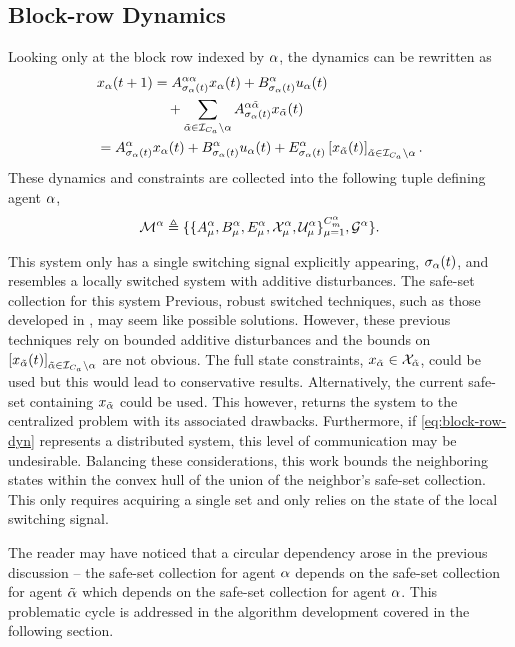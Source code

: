 \subsection{Block-row Dynamics}
Looking only at the block row indexed by $\alpha$, the dynamics can be rewritten as 
\begin{align}\label{eq:block-row-dyn}
x_\agentidx(t+1)&=A^{\agentidx\agentidx}_{\ss_\agentidx(t)}x_\agentidx(t)+B^\agentidx_{\ss_\agentidx(t)}u_\agentidx(t)\nonumber\\&\quad+\sum_{\tilde\agentidx\in\idxset{\numagents}\setminus \agentidx}A^{\agentidx\tilde\agentidx}_{\ss_\agentidx(t)}x_{\tilde\agentidx}(t)\\
=A^{\agentidx}_{\ss_\agentidx(t)}&x_\agentidx(t)+B^\agentidx_{\ss_\agentidx(t)}u_\agentidx(t)+E^\agentidx_{\ss_\agentidx(t)}\left[x_{\tilde\agentidx}(t)\right]_{\tilde\agentidx\in\idxset{\numagents}\setminus \agentidx}.
\end{align}
These dynamics and constraints are collected into the following tuple defining agent $\alpha$,
$$\agent{\agentidx}\triangleq\{\{A^{\agentidx}_{\modeidx},B^\agentidx_{\modeidx},E^\agentidx_{\modeidx},\xcon[\modeidx]^\agentidx,\ucon[\modeidx]^\agentidx\}_{\modeidx=1}^{\nummodes[\agentidx]},\graph^\agentidx\}.$$

This system only has a single switching signal explicitly appearing, ${\sigma}_{\alpha}(t)$, and resembles a locally switched system with additive disturbances. The safe-set collection for this system Previous, robust switched techniques, such as those developed in \cite{Lavaei2021}, may seem like possible solutions. However, these previous techniques rely on bounded additive disturbances and the bounds on $\left[x_{\tilde{\alpha}}(t)\right]_{\tilde{\alpha}\in\mathcal{I}_{{C_a}}\setminus \alpha}$ are not obvious. The full state constraints, $x_{\tilde{\agentidx}}\in\xcon[\tilde{\agentidx}]$, could be used but this would lead to conservative results. Alternatively, the current safe-set containing $x_{\tilde{\alpha}}$ could be used. This however, returns the system to the centralized problem with its associated drawbacks. Furthermore, if \autoref{eq:block-row-dyn} represents a distributed system, this level of communication may be undesirable. Balancing these considerations, this work bounds the neighboring states within the convex hull of the union of the neighbor's safe-set collection. This only requires acquiring a single set and only relies on the state of the local switching signal. 

The reader may have noticed that a circular dependency arose in the previous discussion -- the safe-set collection for agent $\alpha$ depends on the safe-set collection for agent ${\tilde{\alpha}}$ which depends on the safe-set collection for agent $\alpha$. This problematic cycle is addressed in the algorithm development covered in the following section. 